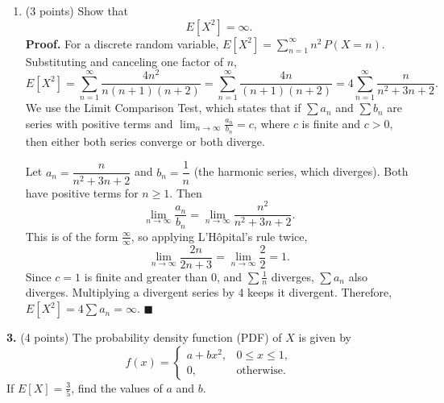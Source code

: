 \documentclass[letterpaper]{article}
\begin{document}
\begin{enumerate}[label=(\alph*), leftmargin=*]
    \textbf{Proof.} To begin, we use the definition of expected value for discrete random variables, $E[X] = \sum_{n=1}^{\infty} n\,P(X=n)$. Substituting and canceling $n$,
    \[
        \sum_{n=1}^{\infty} n\,P(X=n) = \sum_{n=1}^{\infty}\frac{4n}{n(n+1)(n+2)} = 4\sum_{n=1}^{\infty}\frac{1}{(n+1)(n+2)}.
    \]
    Using Partial Fraction Decomposition, write $\frac{1}{(n+1)(n+2)} = \frac{A}{n+1} + \frac{B}{n+2}$. Then $1 = A(n+2) + B(n+1)$, which gives $A = 1$ and $B = -1$, so
    \[
        4\sum_{n=1}^{\infty}\left[\frac{1}{n+1} - \frac{1}{n+2}\right].
    \]
    Let $S_N = \sum_{n=1}^{N} n\,P(X=n)$. Then
    \[
        S_N = 4\left[\left(\frac{1}{2} - \frac{1}{3}\right) + \left(\frac{1}{3} - \frac{1}{4}\right) + \cdots + \left(\frac{1}{N+1} - \frac{1}{N+2}\right)\right] = 4\left[\frac{1}{2} - \frac{1}{N+2}\right].
    \]
    Since $\frac{1}{N+2} \to 0$ as $N \to \infty$,
    \[
        E[X] = \lim_{N\to\infty} S_N = 4\cdot\frac{1}{2} = 2. \quad \blacksquare
    \]
    \item (3 points) Show that
    \[
        E[X^2] = \infty.
    \]
    \textbf{Proof.} For a discrete random variable, $E[X^2] = \sum_{n=1}^{\infty} n^2\,P(X=n)$. Substituting and canceling one factor of $n$,
    \[
            E[X^2] = \sum_{n=1}^{\infty}\frac{4n^2}{n(n+1)(n+2)} = \sum_{n=1}^{\infty}\frac{4n}{(n+1)(n+2)} = 4\sum_{n=1}^{\infty}\frac{n}{n^2 + 3n + 2}.
    \]
    We use the Limit Comparison Test, which states that if $\sum a_n$ and $\sum b_n$ are series with positive terms and $\lim_{n\to\infty}\frac{a_n}{b_n} = c$, where $c$ is finite and $c > 0$, then either both series converge or both diverge.

    Let $a_n = \dfrac{n}{n^2+3n+2}$ and $b_n = \dfrac{1}{n}$ (the harmonic series, which diverges). Both have positive terms for $n \ge 1$. Then
    \[
        \lim_{n\to\infty}\frac{a_n}{b_n} = \lim_{n\to\infty}\frac{n^2}{n^2+3n+2}.
    \]
    This is of the form $\frac{\infty}{\infty}$, so applying L'H\^opital's rule twice,
    \[
        \lim_{n\to\infty}\frac{2n}{2n+3} = \lim_{n\to\infty}\frac{2}{2} = 1.
    \]
    Since $c = 1$ is finite and greater than 0, and $\sum \frac{1}{n}$ diverges, $\sum a_n$ also diverges. Multiplying a divergent series by 4 keeps it divergent. Therefore, $E[X^2] = 4\sum a_n = \infty$. \hfill $\blacksquare$
\end{enumerate}
\textbf{3.} (4 points) The probability density function (PDF) of $X$ is given by
\[
    f(x) =
    \begin{cases}
        a + bx^2, & 0 \le x \le 1, \\
        0, & \text{otherwise.}
    \end{cases}
\]
If $E[X] = \frac{3}{5}$, find the values of $a$ and $b$.
\end{document}
